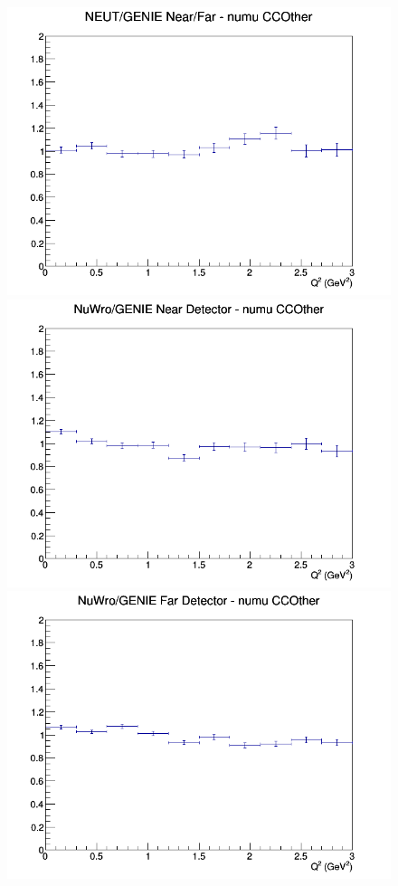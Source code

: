 \begin{figure}[h]
\endminipage
{}
\includegraphics[width=\linewidth]{eff_Q2/FGT/ratios/CCOther_NEUT_GENIE_numu_NF_Q2.png}
\endminipage
\newline
{}
\includegraphics[width=\linewidth]{eff_Q2/FGT/ratios/CCOther_NuWro_GENIE_numu_near_Q2.png}
\endminipage
{}
\includegraphics[width=\linewidth]{eff_Q2/FGT/ratios/CCOther_NuWro_GENIE_numu_far_Q2.png}

\end{figure}
